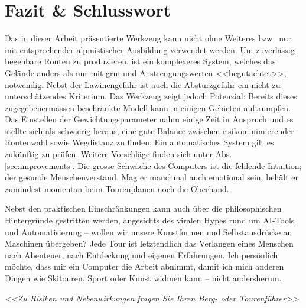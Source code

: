 \section{Fazit \& Schlusswort}

Das in dieser Arbeit präsentierte Werkzeug kann nicht ohne Weiteres bzw.\ nur mit entsprechender alpinistischer Ausbildung verwendet werden. Um zuverlässig begehbare Routen zu produzieren, ist ein komplexeres System, welches das Gelände anders als nur mit \gls{grm} und Anstrengungswerten <<begutachtet>>, notwendig. Nebst der Lawinengefahr ist auch die Absturzgefahr ein nicht zu unterschätzendes Kriterium. Das Werkzeug zeigt jedoch Potenzial: Bereits dieses zugegebenermassen beschränkte Modell kann in einigen Gebieten auftrumpfen. Das Einstellen der Gewichtungsparameter nahm einige Zeit in Anspruch und es stellte sich als schwierig heraus, eine gute Balance zwischen risikominimierender Routenwahl sowie Wegdistanz zu finden. Ein automatisches System gilt es zukünftig zu prüfen. Weitere Vorschläge finden sich unter Abs. \ref{sec:improvements}. Die grosse Schwäche des Computers ist die fehlende Intuition; der gesunde Menschenverstand. Mag er manchmal auch emotional sein, behält er zumindest momentan beim Tourenplanen noch die Oberhand. 

Nebst den praktischen Einschränkungen kann auch über die philosophischen Hintergründe gestritten werden, angesichts des viralen Hypes rund um AI-Tools und Automatisierung -- wollen wir unsere Kunstformen und Selbstausdrücke an Maschinen übergeben? Jede Tour ist letztendlich das Verlangen eines Menschen nach Abenteuer, nach Entdeckung und eigenen Erfahrungen. Ich persönlich möchte, dass mir ein Computer die Arbeit abnimmt, damit ich mich anderen Dingen wie Skitouren, Sport oder Kunst widmen kann -- nicht andersherum.

\large{
  \textit{<<Zu Risiken und Nebenwirkungen fragen Sie Ihren Berg- oder Tourenführer>>}
}